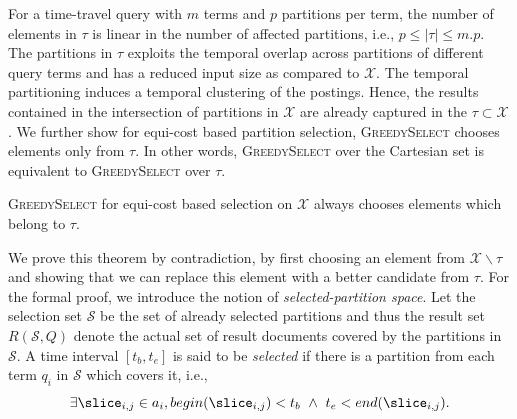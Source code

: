 For a time-travel query with $m$ terms and $p$ partitions per term, the number of elements in $\tau$ is linear in the number of affected partitions, i.e., $p \leq |\tau| \leq m.p$. The partitions in $\tau$ exploits the temporal overlap across partitions of different query terms and has a reduced input size as compared to $\mathcal{X}$. The temporal partitioning induces a temporal clustering of the postings. Hence, the results contained in the intersection of partitions in $\mathcal{X}$ are already captured in the $\tau \subset \mathcal{X}$. We further show for equi-cost based partition selection, \textsc{GreedySelect} chooses elements only from $\tau$. In other words, \textsc{GreedySelect} over the Cartesian set is equivalent to \textsc{GreedySelect} over $\tau$.

\begin{theorem}
  \textsc{GreedySelect} for equi-cost based selection on $\mathcal{X}$ always chooses elements which belong to $\tau$.
  \label{thm:CollapsedChoice}
\end{theorem}



We prove this theorem by contradiction, by first choosing an element from $\mathcal{X}\backslash \tau$ and showing that we can replace this element with a better candidate from $\tau$. For the formal proof, we  introduce the notion of \emph{selected-partition space}. Let the selection set $\mathcal{S}$ be the set of already selected partitions and thus the result set $R(\mathcal{S}, Q)$ denote the actual set of result documents covered by the partitions in $\mathcal{S}$. A time interval $[t_b, t_e]$ is said to be \emph{selected} if there is a partition from each term $q_i$ in $\mathcal{S}$ which covers it, i.e.,
$$ \exists \slice_{i,j} \in a_i, begin(\slice_{i,j}) < t_b \,\,\wedge\,\, t_e < end(\slice_{i,j}).$$

